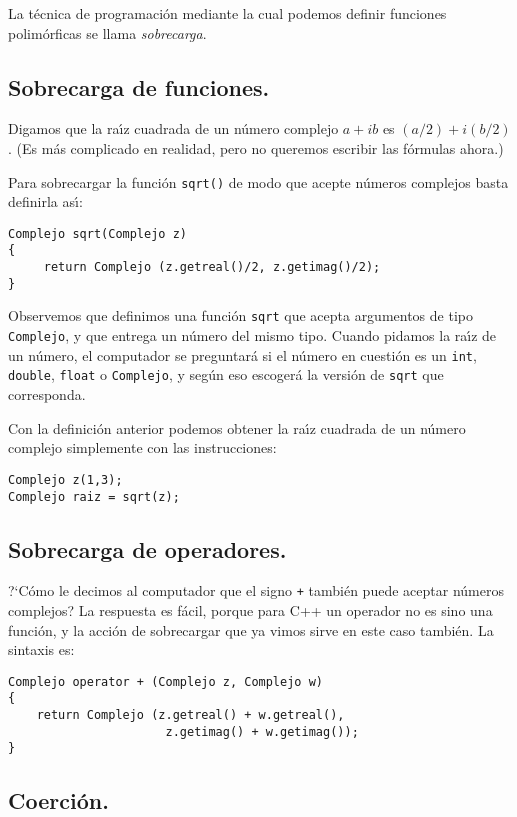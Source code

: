 La t{\'e}cnica de programaci{\'o}n mediante la cual podemos definir
funciones polim{\'o}rficas se llama {\em sobrecarga}. 

\subsection{Sobrecarga de funciones.}

Digamos que la ra\'{\i}z cuadrada de un n{\'u}mero complejo $a+ib$ es
$(a/2) + i(b/2)$. (Es m{\'a}s complicado en realidad, pero no queremos
escribir las f{\'o}rmulas ahora.)

Para sobrecargar la funci{\'o}n \verb+sqrt()+ de modo que acepte
n{\'u}meros complejos basta definirla as\'{\i}:

\begin{verbatim}
Complejo sqrt(Complejo z)
{
     return Complejo (z.getreal()/2, z.getimag()/2);
}
\end{verbatim}
Observemos que definimos una funci{\'o}n \verb+sqrt+ que acepta
argumentos de tipo \verb+Complejo+, y que entrega un n{\'u}mero del
mismo tipo. Cuando pidamos la ra\'{\i}z de un n{\'u}mero, el computador
se preguntar{\'a} si el n{\'u}mero en cuesti{\'o}n es un \verb+int+,
\verb+double+, \verb+float+ o \verb+Complejo+, y seg{\'u}n eso
escoger{\'a} la versi{\'o}n de \verb+sqrt+ que corresponda.

Con la definici{\'o}n anterior podemos obtener la ra\'{\i}z cuadrada de un
n{\'u}mero complejo simplemente con las instrucciones:
\begin{verbatim}
Complejo z(1,3);
Complejo raiz = sqrt(z);
\end{verbatim}

\subsection{Sobrecarga de operadores.}

?`C{\'o}mo le decimos al computador que el signo \verb-+- tambi{\'e}n
puede aceptar n{\'u}meros complejos? La respuesta es f{\'a}cil, porque
para C++ un operador no es sino una funci{\'o}n, y la acci{\'o}n de
sobrecargar que ya vimos sirve en este caso tambi{\'e}n. La sintaxis
es: 
\begin{verbatim}
Complejo operator + (Complejo z, Complejo w)
{
    return Complejo (z.getreal() + w.getreal(), 
                      z.getimag() + w.getimag()); 
} 
\end{verbatim}

\subsection{Coerci{\'o}n.}

